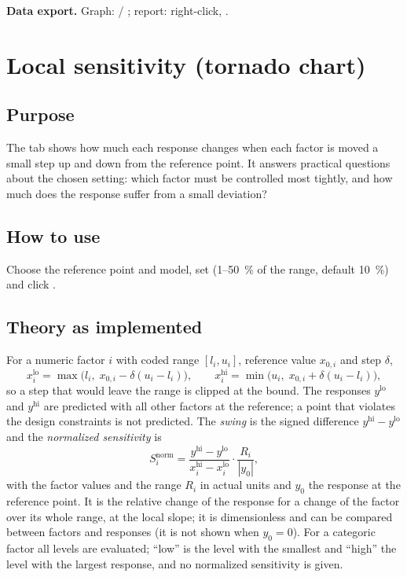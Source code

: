 \textbf{Data export.} Graph:  / ; report: right-click, .

\section{Local sensitivity (tornado chart)}
\label{sec:ch09-local}

\subsection{Purpose}
The tab  shows how much each response changes when each factor is moved a small step
up and down from the reference point. It answers practical questions about the chosen setting: which factor must be
controlled most tightly, and how much does the response suffer from a small deviation?

\subsection{How to use}
Choose the reference point and model, set  (1--50~\% of the range, default 10~\%) and
click .

\subsection{Theory as implemented}
For a numeric factor $i$ with coded range $[l_i,u_i]$, reference value $x_{0,i}$ and step $\delta$,
\begin{equation}
x_i^\text{lo}=\max\bigl(l_i,\;x_{0,i}-\delta(u_i-l_i)\bigr),\qquad
x_i^\text{hi}=\min\bigl(u_i,\;x_{0,i}+\delta(u_i-l_i)\bigr),
\label{eq:ch09-steps}
\end{equation}
so a step that would leave the range is clipped at the bound. The responses $y^\text{lo}$ and $y^\text{hi}$ are
predicted with all other factors at the reference; a point that violates the design constraints is not predicted. The
\emph{swing} is the signed difference $y^\text{hi}-y^\text{lo}$ and the \emph{normalized sensitivity} is
\begin{equation}
S_i^\text{norm}=\frac{y^\text{hi}-y^\text{lo}}{x_i^\text{hi}-x_i^\text{lo}}\cdot\frac{R_i}{|y_0|},
\label{eq:ch09-normsens}
\end{equation}
with the factor values and the range $R_i$ in actual units and $y_0$ the response at the reference point. It is the
relative change of the response for a change of the factor over its whole range, at the local slope; it is
dimensionless and can be compared between factors and responses (it is not shown when $y_0=0$). For a categoric factor
all levels are evaluated; ``low'' is the level with the smallest and ``high'' the level with the largest response, and
no normalized sensitivity is given.

